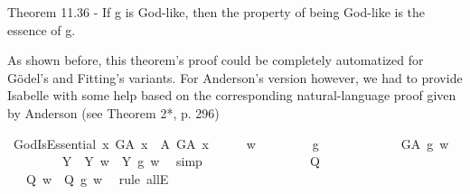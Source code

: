\begin{isabellebody}
\begin{isamarkuptext}%
Theorem 11.36 - If g is God-like, then the property of being God-like is the essence of g.%
\end{isamarkuptext}\isamarkuptrue%
%
\begin{isamarkuptext}%
As shown before, this theorem's proof could be completely automatized for G\"odel's and Fitting's variants.
For Anderson's version however, we had to provide Isabelle with some help based on the corresponding natural-language proof 
given by Anderson (see \cite{anderson90:_some_emend_of_goedel_ontol_proof} Theorem 2*, p. 296)%
\end{isamarkuptext}\isamarkuptrue%
\isamarkupfalse%
\ GodIsEssential{\isacharcolon}\ {\isachardoublequoteopen}{\isasymlfloor}\isactrlbold {\isasymforall}x{\isachardot}\ G\isactrlsup A\ x\ \isactrlbold {\isasymrightarrow}\ {\isacharparenleft}{\isasymE}\isactrlsup A\ G\isactrlsup A\ x{\isacharparenright}{\isasymrfloor}{\isachardoublequoteclose}\isanewline
%
%
%
\isamarkupfalse%
\ {\isacharminus}\isanewline
\isacommand{{\isacharbraceleft}}\isamarkupfalse%
\isanewline
\ \ \isamarkupfalse%
\ w\isanewline
\ \ \isacommand{{\isacharbraceleft}}\isamarkupfalse%
\isanewline
\ \ \ \ \isamarkupfalse%
\ g\isanewline
\ \ \ \ \isacommand{{\isacharbraceleft}}\isamarkupfalse%
\isanewline
\ \ \ \ \ \ \isamarkupfalse%
\ {\isachardoublequoteopen}G\isactrlsup A\ g\ w{\isachardoublequoteclose}\isanewline
\ \ \ \ \ \ \isamarkupfalse%
\ {}{\isacharcolon}\ {\isachardoublequoteopen}{\isasymforall}Y{\isachardot}\ {\isacharparenleft}{\isasymP}\ Y\ w{\isacharparenright}\ {\isasymlongleftrightarrow}\ {\isacharparenleft}\isactrlbold {\isasymbox}{\isacharparenleft}Y\ g{\isacharparenright}{\isacharparenright}\ w{\isachardoublequoteclose}\ \isamarkupfalse%
\ simp\isanewline
\ \ \ \ \ \ \isacommand{{\isacharbraceleft}}\isamarkupfalse%
\isanewline
\ \ \ \ \ \ \ \ \isamarkupfalse%
\ Q\isanewline
\ \ \ \ \ \ \ \ \isamarkupfalse%
\ {}\ \isamarkupfalse%
\ {}{\isacharcolon}\ {\isachardoublequoteopen}{\isacharparenleft}{\isasymP}\ Q\ w{\isacharparenright}\ {\isasymlongleftrightarrow}\ {\isacharparenleft}\isactrlbold {\isasymbox}{\isacharparenleft}Q\ g{\isacharparenright}{\isacharparenright}\ w{\isachardoublequoteclose}\ \isamarkupfalse%
\ {\isacharparenleft}rule\ allE{\isacharparenright}\isanewline
\ \ \ \ \ \ \ \ \isamarkupfalse%

\end{isabellebody}
